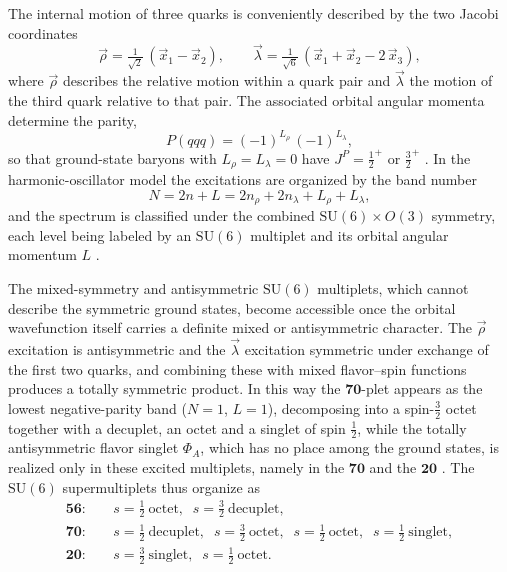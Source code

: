 The internal motion of three quarks is conveniently described by the two Jacobi
coordinates
\begin{equation}
    \vec{\rho} = \tfrac{1}{\sqrt{2}}\,(\vec{x}_1 - \vec{x}_2),
    \qquad
    \vec{\lambda} = \tfrac{1}{\sqrt{6}}\,(\vec{x}_1 + \vec{x}_2 - 2\,\vec{x}_3),
\end{equation}
where $\vec{\rho}$ describes the relative motion within a quark pair and $\vec{\lambda}$
the motion of the third quark relative to that pair. The associated orbital angular
momenta determine the parity,
\begin{equation}
    P(qqq) = (-1)^{L_{\rho}}\,(-1)^{L_{\lambda}},
\end{equation}
so that ground-state baryons with $L_{\rho} = L_{\lambda} = 0$ have $J^P =
\tfrac{1}{2}^+$ or $\tfrac{3}{2}^+$ \cite[Ch.~13]{Amsler2018}. In the harmonic-oscillator
model the excitations are organized by the band number
\begin{equation}
    N = 2n + L = 2 n_\rho + 2 n_\lambda + L_{\rho} + L_{\lambda},
\end{equation}
and the spectrum is classified under the combined $\mathrm{SU}(6) \times O(3)$ symmetry,
each level being labeled by an $\mathrm{SU}(6)$ multiplet and its orbital angular momentum $L$ \cite[Ch.~15]{Amsler2018}.

The mixed-symmetry and antisymmetric $\mathrm{SU}(6)$ multiplets, which cannot describe
the symmetric ground states, become accessible once the orbital wavefunction itself
carries a definite mixed or antisymmetric character. The $\vec{\rho}$ excitation is
antisymmetric and the $\vec{\lambda}$ excitation symmetric under exchange of the first two
quarks, and combining these with mixed flavor--spin functions produces a totally symmetric
product. In this way the $\mathbf{70}$-plet appears as the lowest negative-parity band
($N=1$, $L=1$), decomposing into a spin-$\tfrac{3}{2}$ octet together with a decuplet, an
octet and a singlet of spin $\tfrac{1}{2}$, while the totally antisymmetric flavor singlet
$\Phi_A$, which has no place among the ground states, is realized only in these excited
multiplets, namely in the $\mathbf{70}$ and the $\mathbf{20}$
\cite[Ch.~15]{Amsler2018}. The $\mathrm{SU}(6)$ supermultiplets thus organize as
\begin{align}
    \mathbf{56}: &\quad s=\tfrac{1}{2}\ \text{octet},\;\; s=\tfrac{3}{2}\ \text{decuplet}, \nonumber\\
    \mathbf{70}: &\quad s=\tfrac{1}{2}\ \text{decuplet},\;\; s=\tfrac{3}{2}\ \text{octet},\;\;
                   s=\tfrac{1}{2}\ \text{octet},\;\; s=\tfrac{1}{2}\ \text{singlet}, \\
    \mathbf{20}: &\quad s=\tfrac{3}{2}\ \text{singlet},\;\; s=\tfrac{1}{2}\ \text{octet}. \nonumber
\end{align}

